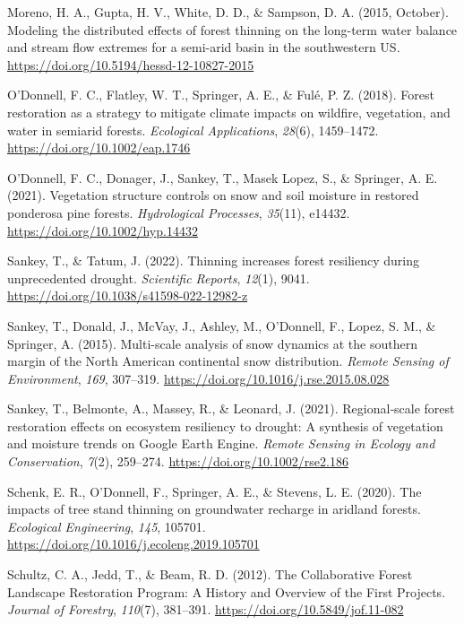\documentclass[
]{agujournal2019}
\newlength{\cslhangindent}
\newenvironment{CSLReferences}[2] %
 {\begin{list}{}{%
  \setlength{\itemindent}{0pt}
  \setlength{\leftmargin}{0pt}
  \setlength{\parsep}{0pt}
  \ifodd #1
   \setlength{\leftmargin}{\cslhangindent}
   \setlength{\itemindent}{-1\cslhangindent}
  \fi
  \setlength{\itemsep}{#2\baselineskip}}}
 {\end{list}}
\begin{document}
\begin{CSLReferences}{1}{0}
Moreno, H. A., Gupta, H. V., White, D. D., \& Sampson, D. A. (2015,
October). Modeling the distributed effects of forest thinning on the
long-term water balance and stream flow extremes for a semi-arid basin
in the southwestern {US}.
\url{https://doi.org/10.5194/hessd-12-10827-2015}

O'Donnell, F. C., Flatley, W. T., Springer, A. E., \& Fulé, P. Z.
(2018). Forest restoration as a strategy to mitigate climate impacts on
wildfire, vegetation, and water in semiarid forests. \emph{Ecological
Applications}, \emph{28}(6), 1459--1472.
\url{https://doi.org/10.1002/eap.1746}

O'Donnell, F. C., Donager, J., Sankey, T., Masek Lopez, S., \& Springer,
A. E. (2021). Vegetation structure controls on snow and soil moisture in
restored ponderosa pine forests. \emph{Hydrological Processes},
\emph{35}(11), e14432. \url{https://doi.org/10.1002/hyp.14432}

Sankey, T., \& Tatum, J. (2022). Thinning increases forest resiliency
during unprecedented drought. \emph{Scientific Reports}, \emph{12}(1),
9041. \url{https://doi.org/10.1038/s41598-022-12982-z}

Sankey, T., Donald, J., McVay, J., Ashley, M., O'Donnell, F., Lopez, S.
M., \& Springer, A. (2015). Multi-scale analysis of snow dynamics at the
southern margin of the {North} {American} continental snow distribution.
\emph{Remote Sensing of Environment}, \emph{169}, 307--319.
\url{https://doi.org/10.1016/j.rse.2015.08.028}

Sankey, T., Belmonte, A., Massey, R., \& Leonard, J. (2021).
Regional‐scale forest restoration effects on ecosystem resiliency to
drought: A synthesis of vegetation and moisture trends on {Google}
{Earth} {Engine}. \emph{Remote Sensing in Ecology and Conservation},
\emph{7}(2), 259--274. \url{https://doi.org/10.1002/rse2.186}

Schenk, E. R., O'Donnell, F., Springer, A. E., \& Stevens, L. E. (2020).
The impacts of tree stand thinning on groundwater recharge in aridland
forests. \emph{Ecological Engineering}, \emph{145}, 105701.
\url{https://doi.org/10.1016/j.ecoleng.2019.105701}

Schultz, C. A., Jedd, T., \& Beam, R. D. (2012). The {Collaborative}
{Forest} {Landscape} {Restoration} {Program}: {A} {History} and
{Overview} of the {First} {Projects}. \emph{Journal of Forestry},
\emph{110}(7), 381--391. \url{https://doi.org/10.5849/jof.11-082}


\end{CSLReferences}
\end{document}
